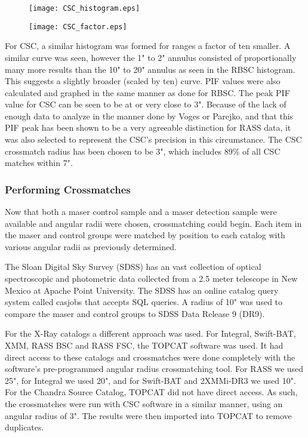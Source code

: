 \documentclass[10pt]{article}
\begin{document}
\begin{figure}[htbp] 
\hspace*{-0.55in}
\centering
\begin{minipage}{.5\textwidth}
	\centering
	\texttt{[image: CSC\_histogram.eps]}
	\label{xyz} 
\end{minipage}%
\begin{minipage}{.5\textwidth}
	\centering
	\texttt{[image: CSC\_factor.eps]} 
	\label{xyz} 
\end{minipage}
\label{fig:test}
\end{figure} 
\begin{multicols}{2}

For CSC, a similar histogram was formed for ranges a factor of ten smaller. A similar curve was seen, however the 1" to 2" annulus consisted of proportionally many more results than the 10" to 20" annulus as seen in the RBSC histogram. This suggests a slightly broader (scaled by ten) curve. PIF values were also calculated and graphed in the same manner as done for RBSC. The peak PIF value for CSC can be seen to be at or very close to 3". Because of the lack of enough data to analyze in the manner done by Voges or Parejko, and that this PIF peak has been shown to be a very agreeable distinction for RASS data, it was also selected to represent the CSC's precision in this circumstance. The CSC crossmatch radius has been chosen to be 3", which includes 89\% of all CSC matches within 7".

\subsubsection{Performing Crossmatches}\label{crossmatch}
\indent Now that both a maser control sample and a maser detection sample were available and angular radii were chosen, crossmatching could begin. Each item in the maser and control groups were matched by position to each catalog with various angular radii as previously determined.

The Sloan Digital Sky Survey (SDSS) has an vast collection of optical spectroscopic and photometric data collected from a 2.5 meter telescope in New Mexico at Apache Point University\cite{sdss}. The SDSS has an online catalog query system called casjobs that accepts SQL queries. A radius of 10" was used to compare the maser and control groups to SDSS Data Release 9 (DR9).

For the X-Ray catalogs a different approach was used. For Integral, Swift-BAT, XMM, RASS BSC and RASS FSC, the TOPCAT software was used. It had direct access to these catalogs and crossmatches were done completely with the software's pre-programmed angular radius crossmatching tool. For RASS we used 25", for Integral we used 20", and for Swift-BAT and 2XMMi-DR3 we used 10". For the Chandra Source Catalog, TOPCAT did not have direct access. As such, the crossmatches were run with CSC software in a similar manner, using an angular radius of 3". The results were then imported into TOPCAT to remove duplicates.


\end{multicols}
\end{document}
